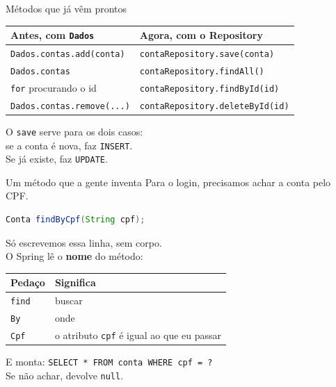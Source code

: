 \documentclass[aspectratio=169,11pt]{beamer}
\begin{document}
\begin{frame}{Métodos que já vêm prontos}
  \begin{center}
  \begin{tabular}{ll}
    \toprule
    Antes, com \texttt{Dados} & Agora, com o Repository \\
    \midrule
    \texttt{Dados.contas.add(conta)} & \texttt{contaRepository.save(conta)} \\
    \texttt{Dados.contas} & \texttt{contaRepository.findAll()} \\
    \texttt{for} procurando o id & \texttt{contaRepository.findById(id)} \\
    \texttt{Dados.contas.remove(...)} & \texttt{contaRepository.deleteById(id)} \\
    \bottomrule
  \end{tabular}
  \end{center}

  \vspace{0.6em}
  O \texttt{save} serve para os dois casos:\\
  se a conta é nova, faz \texttt{INSERT}.\\
  Se já existe, faz \texttt{UPDATE}.
\end{frame}

\begin{frame}[fragile]{Um método que a gente inventa}
  Para o login, precisamos achar a conta pelo CPF.

\begin{lstlisting}[language=Java,basicstyle=\ttfamily\footnotesize]
Conta findByCpf(String cpf);
\end{lstlisting}

  \vspace{0.3em}
  Só escrevemos essa linha, sem corpo.\\
  O Spring lê o \textbf{nome} do método:

  \vspace{0.3em}
  \begin{center}
  \begin{tabular}{ll}
    \toprule
    Pedaço & Significa \\
    \midrule
    \texttt{find} & buscar \\
    \texttt{By} & onde \\
    \texttt{Cpf} & o atributo \texttt{cpf} é igual ao que eu passar \\
    \bottomrule
  \end{tabular}
  \end{center}

  \vspace{0.3em}
  E monta: \texttt{SELECT * FROM conta WHERE cpf = ?}\\
  Se não achar, devolve \texttt{null}.
\end{frame}
\end{document}
